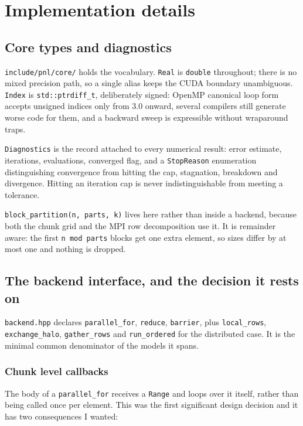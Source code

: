 \documentclass[11pt,a4paper]{report}
\begin{document}
\chapter{Implementation details}

\section{Core types and diagnostics}

\texttt{include/pnl/core/} holds the vocabulary. \texttt{Real} is
\texttt{double} throughout; there is no mixed precision path, so a single alias
keeps the CUDA boundary unambiguous. \texttt{Index} is \texttt{std::ptrdiff\_t},
deliberately signed: OpenMP canonical loop form accepts unsigned indices only
from 3.0 onward, several compilers still generate worse code for them, and a
backward sweep is expressible without wraparound traps.

\texttt{Diagnostics} is the record attached to every numerical result: error
estimate, iterations, evaluations, converged flag, and a \texttt{StopReason}
enumeration distinguishing convergence from hitting the cap, stagnation,
breakdown and divergence. Hitting an iteration cap is never indistinguishable
from meeting a tolerance.

\texttt{block\_partition(n, parts, k)} lives here rather than inside a backend,
because both the chunk grid and the MPI row decomposition use it. It is remainder
aware: the first \texttt{n mod parts} blocks get one extra element, so sizes
differ by at most one and nothing is dropped.

\section{The backend interface, and the decision it rests on}

\texttt{backend.hpp} declares \texttt{parallel\_for}, \texttt{reduce},
\texttt{barrier}, plus \texttt{local\_rows}, \texttt{exchange\_halo},
\texttt{gather\_rows} and \texttt{run\_ordered} for the distributed case. It is
the minimal common denominator of the models it spans.

\subsection{Chunk level callbacks}

The body of a \texttt{parallel\_for} receives a \texttt{Range} and loops over it
itself, rather than being called once per element. This was the first significant
design decision and it has two consequences I wanted:
\end{document}
